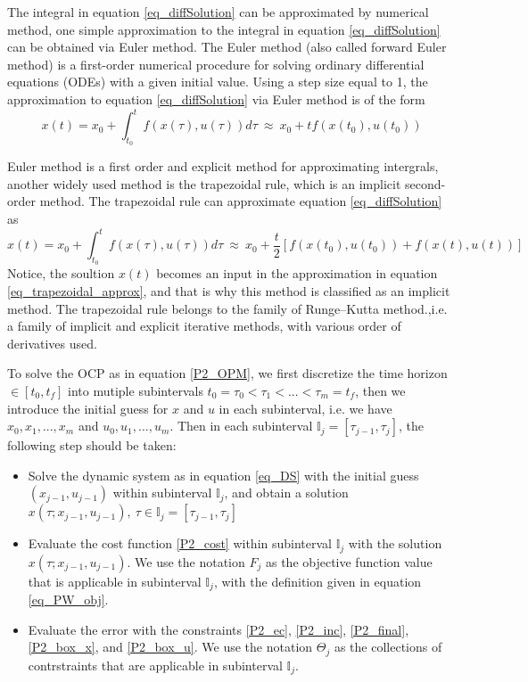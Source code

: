 \documentclass  [
  paper    = a4,
  BCOR     = 10mm,
  twoside,
  fontsize = 12pt,
  fleqn,
  toc      = bibnumbered,
  toc      = listofnumbered,
  numbers  = noendperiod,
  headings = normal,
  listof   = leveldown,
  version  = 3.03
]                                       {scrreprt}
\newcommand{\<}{\langle}
\renewcommand{\>}{\rangle}
\begin{document}
The integral in equation \ref{eq_diffSolution} can be approximated by numerical method, one simple approximation to the integral in equation \ref{eq_diffSolution} can be obtained via Euler method. The Euler method (also called forward Euler method) is a first-order numerical procedure for solving ordinary differential equations (ODEs) with a given initial value. Using a step size equal to 1, the approximation to equation \ref{eq_diffSolution} via Euler method is of the form
\begin{equation}
	x(t)  = x_0  + \int_{t_0}^{t}  f(x(\tau), u(\tau)) d \tau \ \approx \   x_0  + t f(x(t_0), u(t_0))
	\label{eq_Euler_approx}
\end{equation}

Euler method is a first order and explicit method for approximating intergrals, another widely used method is the trapezoidal rule, which is an implicit second-order method. The trapezoidal rule can approximate equation \ref{eq_diffSolution} as 
\begin{equation}
	x(t)  = x_0  + \int_{t_0}^{t}  f(x(\tau), u(\tau)) d \tau \ \approx \   x_0  + \frac{t}{2}[f(x(t_0), u(t_0)) + f(x(t), u(t))]  
	\label{eq_trapezoidal_approx}
\end{equation}
Notice, the soultion $x(t)$ becomes an input in the approximation in equation \ref{eq_trapezoidal_approx}, and that is why this method is classified as an implicit method. The trapezoidal rule belongs to the family of Runge–Kutta method.,i.e. a family of implicit and explicit iterative methods, with various order of derivatives used.

To solve the OCP as in equation \ref{P2_OPM}, we first discretize the time horizon $ \in [t_0, t_f]$ into mutiple subintervals $t_0 = \tau_0 < \tau_1 < ... < \tau_m = t_f$, then we introduce the initial guess for $x$ and $u$ in each subinterval, i.e. we have $x_0, x_1, ..., x_m$ and $u_0, u_1, ..., u_m$. Then in each subinterval $\mathbb{I}_j = [\tau_{j-1}, \tau_j]$, the following step should be taken: 
\begin{itemize}
	\item Solve the dynamic system as in equation \ref{eq_DS} with the initial guess $(x_{j-1}, u_{j-1})$ within subinterval $\mathbb{I}_j$, and obtain a solution $x(\tau; x_{j-1}, u_{j-1}), \ \tau  \in \mathbb{I}_j = [\tau_{j-1}, \tau_j]$  
	\item Evaluate the cost function \ref{P2_cost} within subinterval $\mathbb{I}_j$ with the solution $x(\tau; x_{j-1}, u_{j-1})$. We use the notation $ F_j$ as the objective function value that is applicable in subinterval $\mathbb{I}_j$, with the definition given in equation \ref{eq_PW_obj}.
	\item Evaluate the error with the constraints \ref{P2_ec}, \ref{P2_inc}, \ref{P2_final}, \ref{P2_box_x}, and \ref{P2_box_u}. We use the notation $\Theta_j$ as the collections of contrstraints that are applicable in subinterval $\mathbb{I}_j$.
\end{itemize}
\end{document}
